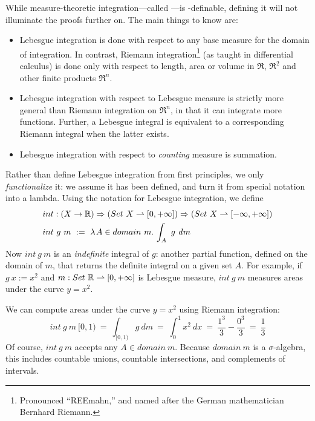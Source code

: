 While measure-theoretic integration---called ---is \lzfclang-definable, defining it will not illuminate the proofs further on.
The main things to know are:
\begin{itemize}
	\item Lebesgue integration is done with respect to any base measure for the domain of integration. In contrast, Riemann integration\footnote{Pronounced ``REEmahn,'' and named after the German mathematician Bernhard Riemann.} (as taught in differential calculus) is done only with respect to length, area or volume in $\Re$, $\Re^2$ and other finite products $\Re^n$.
	\item Lebesgue integration with respect to Lebesgue measure is strictly more general than Riemann integration on $\Re^n$, in that it can integrate more functions. Further, a Lebesgue integral is equivalent to a corresponding Riemann integral when the latter exists.
	\item Lebesgue integration with respect to \emph{counting} measure is summation.
\end{itemize}

Rather than define Lebesgue integration from first principles, we only \emph{functionalize} it: we assume it has been defined, and turn it from special notation into a lambda.
Using the notation for Lebesgue integration, we define
\begin{equation}
\begin{aligned}
	&int : (X \to \mathbb{R}) \Rightarrow (Set~X \rightharpoonup [0,+\infty]) \Rightarrow (Set~X \rightharpoonup [-\infty,+\infty]) \\
	&int~g~m\ :=\ \lambda\mspace{2mu}{A \in domain~m}\ldotp\, \int_A~g~\mathit{d}m
\end{aligned}
\label{eqn:int-type}
\end{equation}
Now $int~g~m$ is an \emph{indefinite} integral of $g$: another partial function, defined on the domain of $m$, that returns the definite integral on a given set $A$.
For example, if $g~x := x^2$ and $m : Set~\mathbb{R} \rightharpoonup [0,+\infty]$ is Lebesgue measure, $int~g~m$ measures areas under the curve $y = x^2$.

We can compute areas under the curve $y = x^2$ using Riemann integration:
\begin{equation}
	int~g~m~[0,1)\ =\ \int_{[0,1)} g~\mathit{d}m\ =\ \int_0^1 x^2\ \mathit{d}x\ =\ \frac{1^3}{3} - \frac{0^3}{3} \ =\ \frac{1}{3}
\end{equation}
Of course, $int~g~m$ accepts any $A \in domain~m$.
Because $domain~m$ is a $\sigma$-algebra, this includes countable unions, countable intersections, and complements of intervals.

